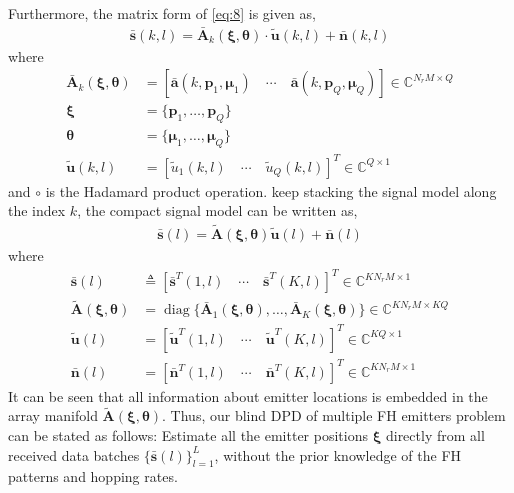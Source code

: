 \documentclass[journal,10pt]{IEEEtran}
\def \diag{\operatorname{diag}}
\begin{document}
Furthermore, the matrix form of \eqref{eq:8} is given as,
\begin{align}\label{eq:11}
    \bar{\boldsymbol{s}}(k,l)= \bar{\boldsymbol{A}}_k(\boldsymbol{\xi},\boldsymbol{\theta}) \cdot \tilde{\boldsymbol{u}}(k,l)+\bar{\boldsymbol{n}}(k,l)
\end{align}
where
\begin{align*}  
    \bar{\boldsymbol{A}}_k(\boldsymbol{\xi},\boldsymbol{\theta})&=[\bar{\boldsymbol{a}}(k,\boldsymbol{p}_1,\boldsymbol{\mu}_{1})\quad \cdots \quad \bar{\boldsymbol{a}}(k,\boldsymbol{p}_Q,\boldsymbol{\mu}_{Q})] \in \mathbb{C}^{N_rM\times Q}\\   
    \boldsymbol{\xi}&=\{\boldsymbol{p}_1, \dots ,\boldsymbol{p}_Q\} \\ 
    \boldsymbol{\theta}&=\{\boldsymbol{\mu}_{1},\dots ,\boldsymbol{\mu}_{Q}\}\\ 
    \tilde{\boldsymbol{u}}(k,l)&=[\tilde{u}_1(k,l) \quad \cdots \quad \tilde{u}_Q(k,l)]^T \in \mathbb{C}^{Q\times 1}  
\end{align*}
and $\circ$ is the Hadamard product operation.
keep stacking the signal model along the index $k$, the compact signal model can be written as,
\begin{align}\label{eq:12}
    \bar{\boldsymbol{s}}(l)=\tilde{\boldsymbol{A}}(\boldsymbol{\xi},\boldsymbol{\theta})\tilde{\boldsymbol{u}}(l)+\bar{\boldsymbol{n}}(l) 
\end{align}
where 
\begin{align*}
    \bar{\boldsymbol{s}}(l)&\triangleq[\bar{\boldsymbol{s}}^T(1,l)\quad  \cdots \quad \bar{\boldsymbol{s}}^T(K,l)]^T \in \mathbb{C}^{KN_rM\times 1 }\\
    \tilde{\boldsymbol{A}}(\boldsymbol{\xi},\boldsymbol{\theta})&=\diag \{\bar{\boldsymbol{A}}_1(\boldsymbol{\xi},\boldsymbol{\theta}),\dots,\bar{\boldsymbol{A}}_K(\boldsymbol{\xi},\boldsymbol{\theta})\} \in \mathbb{C}^{KN_rM\times KQ}\\
    \tilde{\boldsymbol{u}}(l)&=[\tilde{\boldsymbol{u}}^T(1,l) \quad \cdots \quad \tilde{\boldsymbol{u}}^T(K,l)]^T \in \mathbb{C}^{KQ\times 1}\\
    \bar{\boldsymbol{n}}(l)&=[\bar{\boldsymbol{n}}^T(1,l)\quad \cdots \quad \bar{\boldsymbol{n}}^T(K,l)]^T\in \mathbb{C}^{KN_rM\times 1 }
\end{align*}
It can be seen that all information about emitter locations is embedded in the array manifold  $\tilde{\boldsymbol{A}}(\boldsymbol{\xi},\boldsymbol{\theta})$.
Thus, our blind DPD of multiple FH emitters problem can be stated as follows: Estimate all the emitter positions  $\boldsymbol{\xi}$ directly from all received data batches $\lbrace\bar{\boldsymbol{s}}(l)\rbrace_{l=1}^{L}$,
without the prior knowledge of the FH patterns and hopping rates. 
\end{document}
